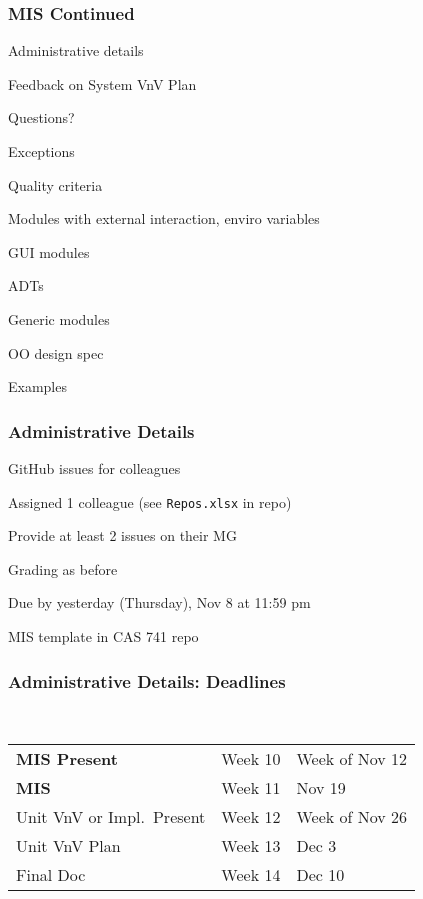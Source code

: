 \documentclass[t,12pt,numbers,fleqn,handout]{beamer}
\begin{document}



\begin{frame}
\frametitle{MIS Continued}

\bi
\item Administrative details
\item Feedback on System VnV Plan
\item Questions?
\item Exceptions
\item Quality criteria
\item Modules with external interaction, enviro variables
\item GUI modules
\item ADTs
\item Generic modules
\item OO design spec
\item Examples
\ei
\end{frame}


\begin{frame}
\frametitle{Administrative Details}

\bi
\item GitHub issues for colleagues
\bi
\item Assigned 1 colleague (see \texttt{Repos.xlsx} in repo)
\item Provide at least 2 issues on their MG
\item Grading as before
\item Due by yesterday (Thursday), Nov 8 at 11:59 pm
\ei
\item MIS template in CAS 741 repo
\ei

\end{frame}


\begin{frame}
\frametitle{Administrative Details: Deadlines}
~\newline
\begin{tabular}{l l l}
\textbf{MIS Present} & Week 10 & Week of Nov 12\\
\textbf{MIS} & Week 11 & Nov 19\\
Unit VnV or Impl.\ Present & Week 12 & Week of Nov 26\\
Unit VnV Plan & Week 13 & Dec 3\\
Final Doc & Week 14 & Dec 10\\
\end {tabular}

\end{frame}
\end{document}

